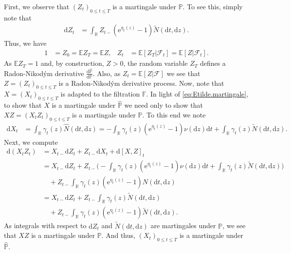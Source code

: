 \documentclass[12pt]{book}
\numberwithin{equation}{chapter}
\theoremstyle{plain}
\numberwithin{theorem}{section}
\theoremstyle{definition}
\numberwithin{exercise}{chapter}
\let\oldendproof\endproof
\renewenvironment{proof}[1][\proofname]{%
  \oldproof[\scshape\underline{#1}]%
}{\oldendproof}
\newcommand{\<}{\langle}
\renewcommand{\>}{\rangle}
\renewcommand{\(}{\left(}
\renewcommand{\)}{\right)}
\renewcommand{\[}{\left[}
\renewcommand{\]}{\right]}
\newcommand\Eb{\mathds{E}}
\newcommand\Fb{\mathds{F}}
\newcommand\Pb{\mathds{P}}
\newcommand\Rb{\mathds{R}}
\newcommand\Fc{\mathscr{F}}
\newcommand\sig{\sigma}
\newcommand\gam{\gamma}
\newcommand\Pbh{\widehat{\Pb}}
\newcommand\Nh{\widehat{N}}
\newcommand\Nt{\widetilde{N}}
\newcommand\dd{\mathrm{d}}
\newcommand\ee{\mathrm{e}}
\begin{document}
\begin{proof}
First, we observe that $(Z_t)_{0 \leq t \leq T}$ is a martingale under $\Pb$.  To see this, simply note that
\begin{align}
\dd Z_t
	&=	\int_\Rb Z_{t-} \( \ee^{\eta_t(z)} - 1 \) \Nt( \dd t , \dd z ) .
\end{align}
Thus, we have
\begin{align}
1
	&=	Z_0
	=		\Eb Z_T
	=		\Eb Z , &
Z_t
	&=	\Eb[ Z_T | \Fc_t ]
	=		\Eb[ Z | \Fc_t ] .
\end{align}
As $\Eb Z_T = 1$ and, by construction, $Z > 0$, the random variable $Z_T$ defines a Radon-Nikod\'ym derivative $\frac{\dd \Pbh}{\dd \Pb}$.
Also, as $Z_t = \Eb[ Z | \Fc ]$ we see that $Z = (Z_t)_{0 \leq t \leq T}$ is a Radon-Nikod\'ym derivative process.
Now, note that $X=(X_t)_{0 \leq t \leq T}$ is adapted to the filtration $\Fb$.
In light of \eqref{eq:Etilde.martingale}, to show that $X$ is a martingale under $\Pbh$ we need only to show that $XZ=(X_t Z_t)_{0 \leq t \leq T}$ is a martingale under $\Pb$.  To this end we note
\begin{align}
\dd X_t
	&=	\int_\Rb \gam_t(z) \Nh( \dd t, \dd z) 
	 =	- \int_\Rb \gam_t(z) \( \ee^{\eta_t(z)} - 1\)\nu(\dd z) \dd t + \int_\Rb \gam_t(z) \Nt( \dd t, \dd z) .
\end{align}
Next, we compute
\begin{align}
\dd ( X_t Z_t)
	&=	X_{t-} \dd Z_t + Z_{t-} \dd X_t + \dd [ X, Z]_t \\
	&=	X_{t-} \dd Z_t + Z_{t-} \Big( - \int_\Rb \gam_t(z) \( \ee^{\eta_t(z)} - 1\)\nu(\dd z) \dd t  + \int_\Rb \gam_t(z) \Nt(\dd t, \dd z) \Big) \\ & \quad
			+ Z_{t-} \int_\Rb \gam_t(z) \( \ee^{\eta_t(z)} - 1 \) N( \dd t , \dd z ) \\
	&=	X_{t-}\dd Z_t + Z_{t-} \int_\Rb \gam_t(z) \Nt(\dd t, \dd z) \\ & \quad
			+ Z_{t-} \int_\Rb \gam_t(z) \( \ee^{\eta_t(z)} - 1 \) \Nt( \dd t , \dd z ) .
\end{align}
As integrals with respect to $\dd Z_t$  and $\Nt(\dd t, \dd z)$ are martingales under $\Pb$, we see that $XZ$ is a martingale under $\Pb$.  And thus, $(X_t)_{0 \leq t \leq T}$ is a martingale under $\Pbh$.
\end{proof}
\end{document}
